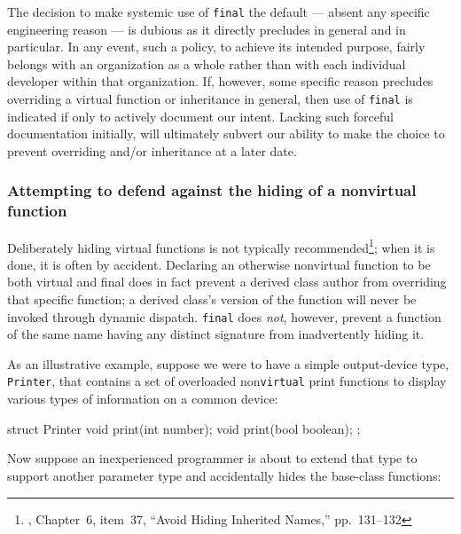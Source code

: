 {The decision to make systemic use of \lstinline!final! the default ---
absent any specific engineering reason --- is dubious as it directly
precludes  in general and  in
particular. In any event, such a policy, to achieve its intended
purpose, fairly belongs with an organization as a whole rather than with
each individual developer within that organization. If, however, some
specific reason precludes overriding a virtual function or inheritance
in general, then use of \lstinline!final! is indicated if only to actively
document our intent. Lacking such forceful documentation initially,
 will ultimately subvert our ability to make the
choice to prevent overriding and/or inheritance at a later date.

\subsubsection[Attempting to defend against the hiding of a non\lstinline!virtual! function]{Attempting to defend against the hiding of a non{\SubsubsecCode virtual} function}\label{attempting-to-defend-against-the-hiding-of-a-nonvirtual-function}

Deliberately hiding virtual functions is not typically
recommended{\cprotect\footnote{\cite{meyers96}, Chapter~6, item~37, ``Avoid
  Hiding Inherited Names,'' pp.~131--132}}; when it is done, it is often
by accident. Declaring an otherwise nonvirtual function to be both
virtual and final does in fact prevent a derived class author from
overriding that specific function; a derived class's version of the
function will never be invoked through dynamic dispatch. \texttt{final}
does \emph{not}, however, prevent a function of the same name having any
distinct signature from inadvertently hiding it.

As an illustrative example, suppose we were to have a simple
output-device type, \texttt{Printer}, that contains a set of overloaded
non\texttt{virtual} print functions to display various types of
information on a common device:

\begin{emcppslisting}[emcppsbatch=e9]
struct Printer
{
    void print(int number);
    void print(bool boolean);
};
\end{emcppslisting}
    

\noindent Now suppose an inexperienced programmer is about to extend that type to
support another parameter type and accidentally hides the base-class
functions:

}
